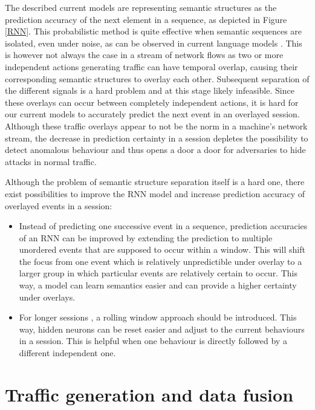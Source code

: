 \documentclass[a4paper,12pt,twoside]{report}
\begin{document}
The described current models are representing semantic structures as the prediction accuracy of the next element in a sequence, as depicted in Figure \ref{RNN}. This probabilistic method is quite effective when semantic sequences are isolated, even under noise, as can be observed in current language models \cite{shi2012towards}. This is however not always the case in a stream of network flows as two or more independent actions generating traffic can have temporal overlap, causing their corresponding semantic structures to overlay each other. Subsequent separation of the different signals is a hard problem and at this stage likely infeasible. Since these overlays can occur between completely independent actions, it is hard for our current models to accurately predict the next event in an overlayed session. Although these traffic overlays appear to not be the norm in a machine's network stream, the decrease in prediction certainty in a session depletes the possibility to detect anomalous behaviour and thus opens a door a door for adversaries to hide attacks in normal traffic. 

Although the problem of semantic structure separation itself is a hard one, there exist possibilities to improve the RNN model and increase prediction accuracy of overlayed events in a session:

\begin{itemize}
\item Instead of predicting one successive event in a sequence, prediction accuracies of an RNN can be improved by extending the prediction to multiple unordered events that are supposed to occur within a window. This will shift the focus from one event which is relatively unpredictible under overlay to a larger group in which particular events are relatively certain to occur. This way, a model can learn semantics easier and can provide a higher certainty under overlays.
\item  For longer sessions , a rolling window approach should be introduced. This way, hidden neurons can be reset easier and adjust to the current behaviours in a session. This is helpful when one behaviour is directly followed by a different independent one.
\end{itemize}





\section{Traffic generation and data fusion}
\end{document}
